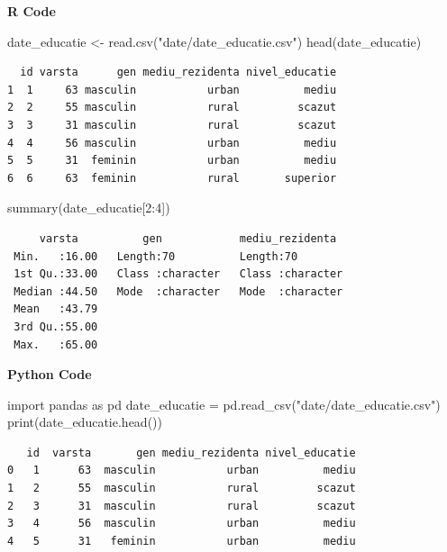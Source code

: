 \documentclass[
  11pt,
  b5paper,
  nottoc]{book}
\newenvironment{Shaded}{\begin{snugshade}}{\end{snugshade}}
\newcommand{\BuiltInTok}[1]{\textcolor[rgb]{0.00,0.23,0.31}{#1}}
\newcommand{\DecValTok}[1]{\textcolor[rgb]{0.68,0.00,0.00}{#1}}
\newcommand{\FunctionTok}[1]{\textcolor[rgb]{0.28,0.35,0.67}{#1}}
\newcommand{\ImportTok}[1]{\textcolor[rgb]{0.00,0.46,0.62}{#1}}
\newcommand{\NormalTok}[1]{\textcolor[rgb]{0.00,0.23,0.31}{#1}}
\newcommand{\OperatorTok}[1]{\textcolor[rgb]{0.37,0.37,0.37}{#1}}
\newcommand{\OtherTok}[1]{\textcolor[rgb]{0.00,0.23,0.31}{#1}}
\newcommand{\SpecialCharTok}[1]{\textcolor[rgb]{0.37,0.37,0.37}{#1}}
\newcommand{\StringTok}[1]{\textcolor[rgb]{0.13,0.47,0.30}{#1}}
\begin{document}
\textbf{R Code}

\begin{Shaded}
\begin{Highlighting}[]
\NormalTok{date\_educatie }\OtherTok{\textless{}{-}} \FunctionTok{read.csv}\NormalTok{(}\StringTok{"date/date\_educatie.csv"}\NormalTok{)}
\FunctionTok{head}\NormalTok{(date\_educatie)}
\end{Highlighting}
\end{Shaded}

\begin{verbatim}
  id varsta      gen mediu_rezidenta nivel_educatie
1  1     63 masculin           urban          mediu
2  2     55 masculin           rural         scazut
3  3     31 masculin           rural         scazut
4  4     56 masculin           urban          mediu
5  5     31  feminin           urban          mediu
6  6     63  feminin           rural       superior
\end{verbatim}

\begin{Shaded}
\begin{Highlighting}[]
\FunctionTok{summary}\NormalTok{(date\_educatie[}\DecValTok{2}\SpecialCharTok{:}\DecValTok{4}\NormalTok{])}
\end{Highlighting}
\end{Shaded}

\begin{verbatim}
     varsta          gen            mediu_rezidenta   
 Min.   :16.00   Length:70          Length:70         
 1st Qu.:33.00   Class :character   Class :character  
 Median :44.50   Mode  :character   Mode  :character  
 Mean   :43.79                                        
 3rd Qu.:55.00                                        
 Max.   :65.00                                        
\end{verbatim}

\textbf{Python Code}

\begin{Shaded}
\begin{Highlighting}[]
\ImportTok{import}\NormalTok{ pandas }\ImportTok{as}\NormalTok{ pd}
\NormalTok{date\_educatie }\OperatorTok{=}\NormalTok{ pd.read\_csv(}\StringTok{"date/date\_educatie.csv"}\NormalTok{)}
\BuiltInTok{print}\NormalTok{(date\_educatie.head())}
\end{Highlighting}
\end{Shaded}

\begin{verbatim}
   id  varsta       gen mediu_rezidenta nivel_educatie
0   1      63  masculin           urban          mediu
1   2      55  masculin           rural         scazut
2   3      31  masculin           rural         scazut
3   4      56  masculin           urban          mediu
4   5      31   feminin           urban          mediu
\end{verbatim}
\end{document}
